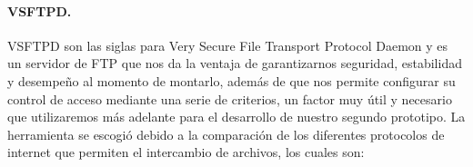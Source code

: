 \documentclass[12pt, a4paper, titlepage]{report}
\begin{document}
            \paragraph{VSFTPD.\\}
            VSFTPD son las siglas para Very Secure File Transport Protocol Daemon y es un servidor de FTP que nos da la ventaja de garantizarnos seguridad, estabilidad y desempeño al momento de montarlo, además de que nos permite configurar su control de acceso mediante una serie de criterios, un factor muy útil y necesario que utilizaremos más adelante para el desarrollo de nuestro segundo prototipo.
            \cite{refVSFTPD}
            La herramienta se escogió debido a la comparación de los diferentes protocolos de internet que permiten el intercambio de archivos, los cuales son:\\
\end{document}
